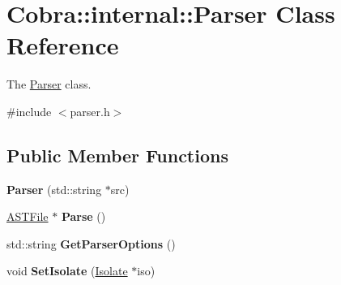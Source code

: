\hypertarget{class_cobra_1_1internal_1_1_parser}{\section{Cobra\+:\+:internal\+:\+:Parser Class Reference}
\label{class_cobra_1_1internal_1_1_parser}
}


The \hyperlink{class_cobra_1_1internal_1_1_parser}{Parser} class.  




{\ttfamily \#include $<$parser.\+h$>$}

\subsection*{Public Member Functions}
\begin{DoxyCompactItemize}
\item 
\hypertarget{class_cobra_1_1internal_1_1_parser_afe862607a7f026db254da7cf74cd16c3}{{\bfseries Parser} (std\+::string $\ast$src)}\label{class_cobra_1_1internal_1_1_parser_afe862607a7f026db254da7cf74cd16c3}

\item 
\hypertarget{class_cobra_1_1internal_1_1_parser_a8051b75a9ac8860f4bed94e15a59058b}{\hyperlink{class_cobra_1_1internal_1_1_a_s_t_file}{A\+S\+T\+File} $\ast$ {\bfseries Parse} ()}\label{class_cobra_1_1internal_1_1_parser_a8051b75a9ac8860f4bed94e15a59058b}

\item 
\hypertarget{class_cobra_1_1internal_1_1_parser_a6696931061cae449c1fc8980b26ef75a}{std\+::string {\bfseries Get\+Parser\+Options} ()}\label{class_cobra_1_1internal_1_1_parser_a6696931061cae449c1fc8980b26ef75a}

\item 
\hypertarget{class_cobra_1_1internal_1_1_parser_a91dbe127c7b13d0a81af987b65da3730}{void {\bfseries Set\+Isolate} (\hyperlink{class_cobra_1_1internal_1_1_isolate}{Isolate} $\ast$iso)}\label{class_cobra_1_1internal_1_1_parser_a91dbe127c7b13d0a81af987b65da3730}

\end{DoxyCompactItemize}
